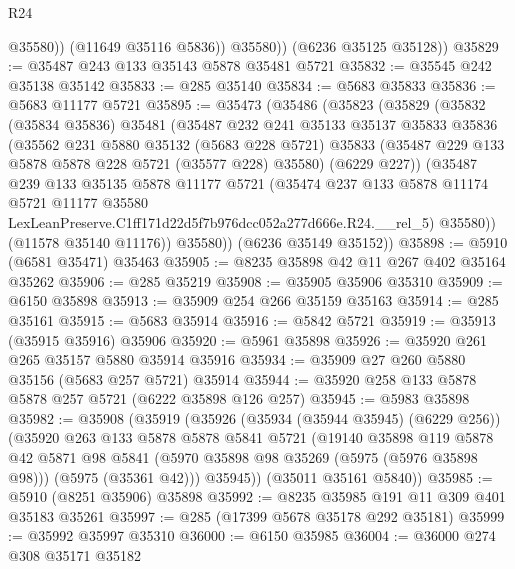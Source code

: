 \begin{lexlean}{R24}
\begin{coremodule}
                @35580))
            (@11649 @35116 @5836))
          @35580))
      (@6236 @35125 @35128))
@35829 := @35487 @243 @133 @35143 @5878 @35481 @5721
@35832 := @35545 @242 @35138 @35142
@35833 := @285 @35140
@35834 := @5683 @35833
@35836 := @5683 @11177 @5721
@35895 := @35473
    (@35486
      (@35823
        (@35829
          (@35832
            (@35834 @35836)
            @35481
            (@35487
              @232
              @241
              @35133
              @35137
              @35833
              @35836
              (@35562
                @231
                @5880
                @35132
                (@5683 @228 @5721)
                @35833
                (@35487 @229 @133 @5878 @5878 @228 @5721 (@35577 @228) @35580)
                (@6229 @227))
              (@35487
                @239
                @133
                @35135
                @5878
                @11177
                @5721
                (@35474
                  @237
                  @133
                  @5878
                  @11174
                  @5721
                  @11177
                  @35580
                  LexLeanPreserve.C1ff171d22d5f7b976dcc052a277d666e.R24.__rel_5)
                @35580))
            (@11578 @35140 @11176))
          @35580))
      (@6236 @35149 @35152))
@35898 := @5910 (@6581 @35471) @35463
@35905 := @8235 @35898 @42 @11 @267 @402 @35164 @35262
@35906 := @285 @35219
@35908 := @35905 @35906 @35310
@35909 := @6150 @35898
@35913 := @35909 @254 @266 @35159 @35163
@35914 := @285 @35161
@35915 := @5683 @35914
@35916 := @5842 @5721
@35919 := @35913 (@35915 @35916) @35906
@35920 := @5961 @35898
@35926 := @35920 @261 @265 @35157 @5880 @35914 @35916
@35934 := @35909 @27 @260 @5880 @35156 (@5683 @257 @5721) @35914
@35944 := @35920 @258 @133 @5878 @5878 @257 @5721 (@6222 @35898 @126 @257)
@35945 := @5983 @35898
@35982 := @35908
    (@35919
      (@35926
        (@35934 (@35944 @35945) (@6229 @256))
        (@35920
          @263
          @133
          @5878
          @5878
          @5841
          @5721
          (@19140
            @35898
            @119
            @5878
            @42
            @5871
            @98
            @5841
            (@5970 @35898 @98 @35269 (@5975 (@5976 @35898 @98)))
            (@5975 (@35361 @42)))
          @35945))
      (@35011 @35161 @5840))
@35985 := @5910 (@8251 @35906) @35898
@35992 := @8235 @35985 @191 @11 @309 @401 @35183 @35261
@35997 := @285 (@17399 @5678 @35178 @292 @35181)
@35999 := @35992 @35997 @35310
@36000 := @6150 @35985
@36004 := @36000 @274 @308 @35171 @35182

\end{coremodule}
\end{lexlean}
